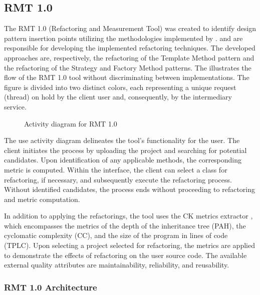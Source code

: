 \subsection{RMT 1.0}
\label{sub-rmt}

The RMT 1.0 (Refactoring and Measurement Tool) was created to identify design pattern insertion points utilizing the methodologies implemented by \textcite{beluzzo2018abordagem}. \textcite{zafeiris2017automated} and \textcite{Liu2014} are responsible for developing the implemented refactoring techniques. The developed approaches are, respectively, the refactoring of the Template Method pattern and the refactoring of the Strategy and Factory Method patterns. The  illustrates the flow of the RMT 1.0 tool without discriminating between implementations. The figure is divided into two distinct colors, each representing a unique request (thread) on hold by the client user and, consequently, by the intermediary service.

\begin{figure}[ht!]
\SetCaptionWidth{\textwidth}
\caption{Activity diagram for RMT 1.0}
\label{fig-activity-rmt}
\fontsize{3.8}{5}\selectfont

\end{figure}
\FloatBarrier

The use activity diagram delineates the tool's functionality for the user. The client initiates the process by uploading the project and searching for potential candidates. Upon identification of any applicable methods, the corresponding metric is computed. Within the interface, the client can select a class for refactoring, if necessary, and subsequently execute the refactoring process. Without identified candidates, the process ends without proceeding to refactoring and metric computation.

In addition to applying the refactorings, the tool uses the CK metrics extractor \cite{ck}, which encompasses the metrics of the depth of the inheritance tree (PAH), the cyclomatic complexity (CC), and the size of the program in lines of code (TPLC). Upon selecting a project selected for refactoring, the metrics are applied to demonstrate the effects of refactoring on the user source code. The available external quality attributes are maintainability, reliability, and reusability.

\subsubsection{RMT 1.0 Architecture}
\label{sub-architecture}

